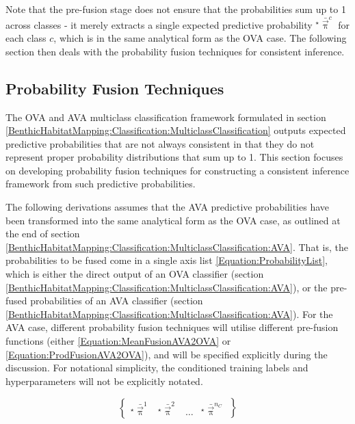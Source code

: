 				Note that the pre-fusion stage does not ensure that the probabilities sum up to 1 across classes - it merely extracts a single expected predictive probability ${^{\star}}\bar{\vec{\uppi}}^{c}$ for each class $c$, which is in the same analytical form as the OVA case. The following section then deals with the probability fusion techniques for consistent inference.
				
		\subsection{Probability Fusion Techniques}
		\label{BenthicHabitatMapping:Classification:ProbabilityFusion}
			
			The OVA and AVA multiclass classification framework formulated in section \ref{BenthicHabitatMapping:Classification:MulticlassClassification} outputs expected predictive probabilities that are not always consistent in that they do not represent proper probability distributions that sum up to 1. This section focuses on developing probability fusion techniques for constructing a consistent inference framework from such predictive probabilities.
			
			The following derivations assumes that the AVA predictive probabilities have been transformed into the same analytical form as the OVA case, as outlined at the end of section \ref{BenthicHabitatMapping:Classification:MulticlassClassification:AVA}. That is, the probabilities to be fused come in a single axis list \eqref{Equation:ProbabilityList}, which is either the direct output of an OVA classifier (section \ref{BenthicHabitatMapping:Classification:MulticlassClassification:AVA}), or the pre-fused probabilities of an AVA classifier (section \ref{BenthicHabitatMapping:Classification:MulticlassClassification:AVA}). For the AVA case, different probability fusion techniques will utilise different pre-fusion functions (either \eqref{Equation:MeanFusionAVA2OVA} or \eqref{Equation:ProdFusionAVA2OVA}), and will be specified explicitly during the discussion. For notational simplicity, the conditioned training labels and hyperparameters will not be explicitly notated.
			
			\begin{equation}
				\begin{Bmatrix*}
					{^{\star}}\bar{\vec{\uppi}}^{1} & {^{\star}}\bar{\vec{\uppi}}^{2} & \dots & {^{\star}}\bar{\vec{\uppi}}^{n_{C}}
				\end{Bmatrix*} 
			\label{Equation:ProbabilityList}
			\end{equation}
				

